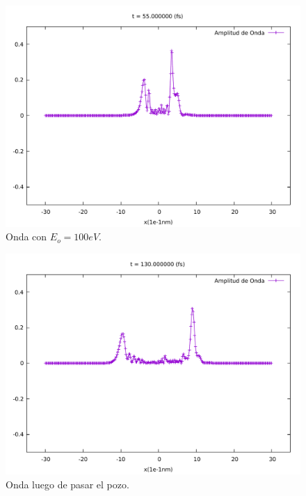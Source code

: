 \begin{multicols}{2}
\begin{figure}[H]
	\centering
	\includegraphics[scale=0.25]{../img/ej7-25_1.pdf}
	\caption{Onda con $E_o = 100eV$.}
	\label{ej7-25_1}
\end{figure}

\begin{figure}[H]
	\centering
	\includegraphics[scale=0.25]{../img/ej7-25_2.pdf}
	\caption{Onda luego de pasar el pozo.}
	\label{ej7-25_2}
\end{figure}
\end{multicols}


